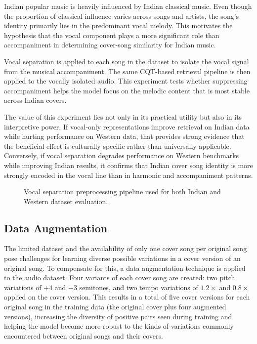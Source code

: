 \documentclass[conference]{IEEEtran}
\begin{document}
Indian popular music is heavily influenced by Indian classical music. Even though the proportion of classical influence varies across songs and artists, the song's identity primarily lies in the predominant vocal melody. This motivates the hypothesis that the vocal component plays a more significant role than accompaniment in determining cover-song similarity for Indian music.

Vocal separation is applied to each song in the dataset to isolate the vocal signal from the musical accompaniment. The same CQT-based retrieval pipeline is then applied to the vocally isolated audio. This experiment tests whether suppressing accompaniment helps the model focus on the melodic content that is most stable across Indian covers.

The value of this experiment lies not only in its practical utility but also in its interpretive power. If vocal-only representations improve retrieval on Indian data while hurting performance on Western data, that provides strong evidence that the beneficial effect is culturally specific rather than universally applicable. Conversely, if vocal separation degrades performance on Western benchmarks while improving Indian results, it confirms that Indian cover song identity is more strongly encoded in the vocal line than in harmonic and accompaniment patterns.

\vspace{0.5em}
\begin{figure}[htbp]
    \centering
    \caption{Vocal separation preprocessing pipeline used for both Indian and Western dataset evaluation.}
    \label{fig:vocal_sep}
\end{figure}
\vspace{0.5em}

\subsection{Data Augmentation}

The limited dataset and the availability of only one cover song per original song pose challenges for learning diverse possible variations in a cover version of an original song. To compensate for this, a data augmentation technique is applied to the audio dataset. Four variants of each cover song are created: two pitch variations of $+4$ and $-3$ semitones, and two tempo variations of $1.2\times$ and $0.8\times$ applied on the cover version. This results in a total of five cover versions for each original song in the training data (the original cover plus four augmented versions), increasing the diversity of positive pairs seen during training and helping the model become more robust to the kinds of variations commonly encountered between original songs and their covers.
\end{document}
